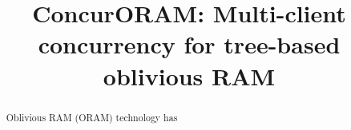 \documentclass{acm}
\title{ConcurORAM: Multi-client concurrency for tree-based oblivious RAM}
\begin{document}
\maketitle
\begin{abstract}
 Oblivious RAM (ORAM) technology has 
 
\end{abstract}







\end{document}
